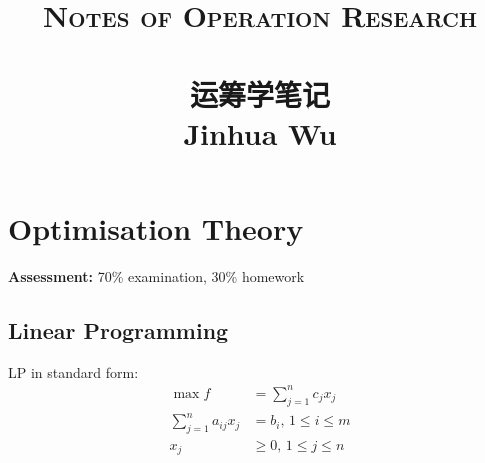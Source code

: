 
\usepackage{ulem}
\usepackage{pdfpages}
\usepackage{soul}
\usepackage{etoolbox}
\usepackage{graphicx}
\usepackage{multicol}
\usepackage{multirow}
\usepackage{amsmath}
\usepackage{amssymb}
\usepackage{hyperref}
\usepackage{cleveref}
\usepackage{annotate-equations}
\usepackage{enumitem}
\usepackage{zhlipsum}
\usepackage{enumitem}
\usepackage{zhlipsum}
\usepackage{enumitem}
\usepackage{amsmath}
\usepackage{amssymb}
\usepackage{hyperref}
\usepackage{accents}
\usepackage{cleveref}
\usepackage{annotate-equations}
\usepackage{bbm}
\usepackage{diagbox}
\usepackage{enumerate}
\usetikzlibrary{positioning}



\newcommand*\circled[1]{\tikz[baseline=(char.base)]{
            \node[shape=circle,draw,inner sep=2pt] (char) {#1};}}

\linespread{1.5}
\title{ \normalsize \textsc{Notes of Operation Research}
		\\ [2.0cm]
		\HRule{1.5pt} \\
		\LARGE \textbf{\uppercase{运筹学笔记}
		\HRule{2.0pt} \\ [0.6cm] \LARGE{Jinhua Wu} \vspace*{10\baselineskip}}
		}
\date{}
\author{}


\maketitle
\tableofcontents 
\newpage
\setcounter{page}{1}
\chapter{Optimisation Theory}
\begin{center}
    \textbf{Assessment:} 70\% examination, 30\% homework
    
    
\end{center}
\section{Linear Programming}
LP in standard form: 
\begin{align}
    \max {} f & = \sum\limits_{j=1}^n c_j x_j \nonumber \\
    \sum\limits_{j=1}^n a_{ij}x_j & = b_i \text{, } 1\le i\le m \nonumber \\
    x_j & \ge 0 \text{, } 1\le j\le n \label{LP standard}
\end{align}

